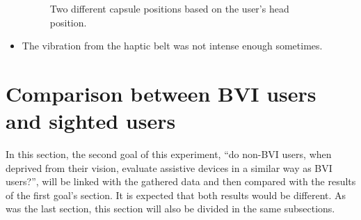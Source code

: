 \begin{itemize}
\begin{figure}[!htb]
\begin{minipage}{0.45\textwidth}
            \label{fig:user_looking_down}
        \end{minipage}
        \caption{Two different capsule positions based on the user's head position.}
        \label{fig:user_envelope}
    \end{figure}
    
    \item The vibration from the haptic belt was not intense enough sometimes.
\end{itemize}

\section{Comparison between BVI users and sighted users}

In this section, the second goal of this experiment, “do non-BVI users, when deprived from their vision, evaluate assistive devices in a similar way as BVI users?”, will be linked with the gathered data and then compared with the results of the first goal's section. It is expected that both results would be different. As was the last section, this section will also be divided in the same subsections.


 

